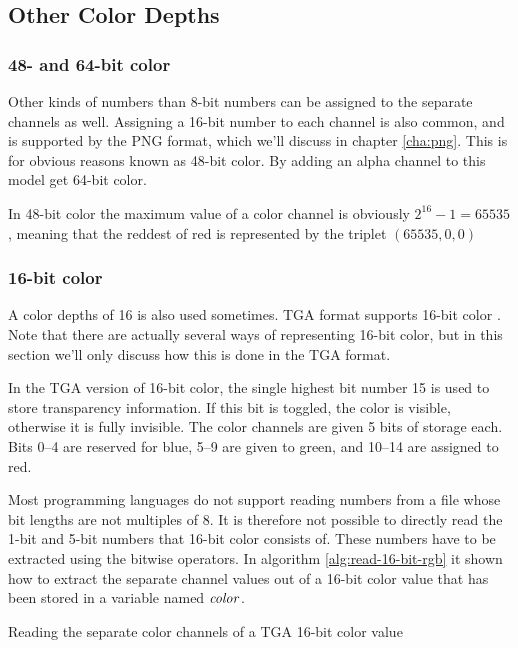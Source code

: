 \subsection{Other Color Depths}
\label{sec:other-channel-sizes}

\subsubsection{48- and 64-bit color}

Other kinds of numbers than 8-bit numbers can be assigned to the
separate channels as well. Assigning a 16-bit number to each channel
is also common, and is supported by the PNG
format\cite{boutel:_png_portab_networ_graph_specif_version12}, which
we'll discuss in chapter \ref{cha:png}. This is for obvious reasons
known as 48-bit color. By adding an alpha channel to this model get
64-bit color.

In 48-bit color the maximum value of a color channel is obviously
$2^{16} - 1 = 65535$, meaning that the reddest of red is represented
by the triplet $(65535, 0, 0)$

\subsubsection{16-bit color}

A color depths of 16 is also used sometimes. TGA format supports
16-bit color \cite{91:_truev_tga_file_format_specif}. Note that there
are actually several ways of representing 16-bit color, but in this
section we'll only discuss how this is done in the TGA format.

In the TGA version of 16-bit color, the single highest bit number 15
is used to store transparency information. If this bit is toggled, the
color is visible, otherwise it is fully invisible. The \rgb color
channels are given 5 bits of storage each. Bits 0--4 are reserved
for blue, 5--9 are given to green, and 10--14 are assigned to red.

Most programming languages do not support reading numbers from a file
whose bit lengths are not multiples of 8. It is therefore not possible
to directly read the 1-bit and 5-bit numbers that 16-bit color
consists of. These numbers have to be extracted using the bitwise
operators. In algorithm \ref{alg:read-16-bit-rgb} it shown how to
extract the separate channel values out of a 16-bit color value that
has been stored in a variable named $\mathit{color}$.

\begin{algorithm}[H]
  \caption{Reading the separate color channels of a TGA 16-bit color
    value}\algohack{}
  \label{alg:read-16-bit-rgb}
  \begin{algorithmic}[1]
  \end{algorithmic}
\end{algorithm}

